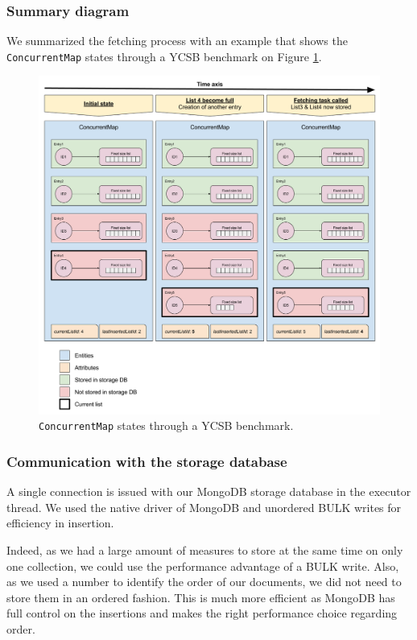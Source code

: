 \documentclass[a4paper,11pt]{report}
\begin{document}
\subsubsection{Summary diagram}

We summarized the fetching process with an example that shows the \texttt{ConcurrentMap} states through a YCSB benchmark on Figure \ref{concurrent_map_scheme}.

\begin{figure}[ht]
\begin{center}
\includegraphics[width=1\linewidth]{images/concurrent_map_scheme.png}
\caption{\texttt{ConcurrentMap} states through a YCSB benchmark.}
\label{concurrent_map_scheme}
\end{center}
\end{figure}

\subsubsection{Communication with the storage database}

A single connection is issued with our MongoDB storage database in the executor thread. We used the native driver of MongoDB and unordered BULK writes for efficiency in insertion.

Indeed, as we had a large amount of measures to store at the same time on only one collection, we could use the performance advantage of a BULK write. Also, as we used a number to identify the order of our documents, we did not need to store them in an ordered fashion. This is much more efficient as MongoDB has full control on the insertions and makes the right performance choice regarding order. 
\end{document}

